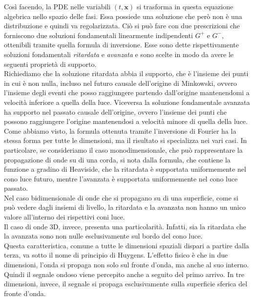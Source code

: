 \documentclass[11pt,a4paper]{article}
\theoremstyle{classicthm}
\theoremstyle{classicthm}
\theoremstyle{definition}
\begin{document}
			Così facendo, la PDE nelle variabili $(t,\mathbf{x})$ si trasforma in questa equazione algebrica nello spazio delle fasi. Essa possiede una soluzione che però non è una distribuzione e quindi va regolarizzata. Ciò si può fare con due prescrizioni che forniscono due soluzioni fondamentali linearmente indipendenti $G^+$ e $G^-$, ottenibili tramite quella formula di inversione. Esse sono dette rispettivamente soluzioni fondamentali \emph{ritardata} e \emph{avanzata} e sono scelte in modo da avere le seguenti proprietà di supporto.\\
			
			Richiediamo che la soluzione ritardata abbia il supporto, che è l'insieme dei punti in cui è non nulla, incluso nel futuro causale dell'origine di Minkowski, ovvero l'insieme degli eventi che posso raggiungere partendo dall'origine mantenendomi a velocità inferiore a quella della luce. Viceversa la soluzione fondamentale avanzata ha supporto nel passato causale dell'origine, ovvero l'insieme dei punti che possono raggiungere l'origine mantenendosi a velocità minore di quella della luce.\\
			
			Come abbiamo visto, la formula ottenuta tramite l'inversione di Fourier ha la stessa forma per tutte le dimensioni, ma il risultato si specializza nei vari casi. In particolare, se consideriamo il caso monodimensionale, che può rappresentare la propagazione di onde su di una corda, si nota dalla formula, che contiene la funzione a gradino di Heaviside, che la ritardata è supportata uniformemente nel cono luce futuro, mentre l'avanzata è supportata uniformemente nel cono luce passato.\\
			
			Nel caso bidimensionale di onde che si propagano su di una superficie, come si può vedere dagli insiemi di livello, la ritardata e la avanzata non hanno un unico valore all'interno dei rispettivi coni luce.\\
			
			Il caso di onde 3D, invece, presenta una particolarità. Infatti, sia la ritardata che la avanzata sono non nulle esclusivamente sul bordo del cono luce.\\
			
			Questa caratteristica, comune a tutte le dimensioni spaziali dispari a partire dalla terza, va sotto il nome di principio di Huygens. L'effetto fisico è che in due dimensioni, l'onda si propaga non solo sul fronte d'onda, ma anche al suo interno.  Quindi il segnale ondoso viene percepito anche a seguito del primo arrivo. In tre dimensioni, invece, il segnale si propaga esclusivamente sulla superficie sferica del fronte d'onda.\\
			
\end{document}
